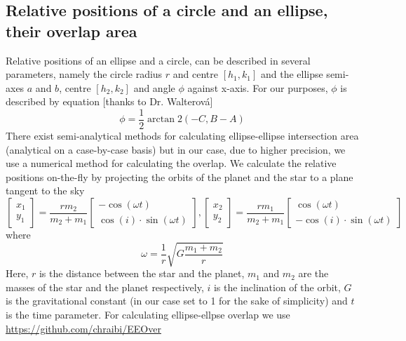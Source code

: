 \documentclass[10pt]{article}
\numberwithin{equation}{subsection}
\begin{document}
\subsection{Relative positions of a circle and an ellipse, their overlap area}
Relative positions of an ellipse and a circle, can be described
in several parameters, namely the circle radius $r$ and centre $[h_1, k_1]$ and the
ellipse semi-axes $a$ and $b$, centre $[h_2, k_2]$ and angle $\phi$ against x-axis. For
our purposes, $\phi$ is described by equation \cite{correia1} [thanks to Dr. Walterová]
\begin{equation}
  \phi = \frac{1}{2}\arctan 2(-C, B-A)
  \label{eq:phi}
\end{equation}
There exist semi-analytical methods for calculating ellipse-ellipse intersection area
(analytical on a case-by-case basis) \cite{eeover} but in our case, due to higher
precision, we use a numerical method for calculating the overlap.
We calculate the relative positions on-the-fly by projecting the orbits of the planet
and the star to a plane tangent to the sky
\begin{equation}
  \begin{bmatrix}
    x_1 \\
    y_1 
  \end{bmatrix}
  = \frac{rm_2}{m_2+m_1}
  \begin{bmatrix}
    -\cos(\omega t) \\
    \cos(i)\cdot\sin(\omega t)
  \end{bmatrix},
  \begin{bmatrix}
    x_2 \\
    y_2 
  \end{bmatrix}
  = \frac{rm_1}{m_2+m_1}
  \begin{bmatrix}
    \cos(\omega t) \\
    -\cos(i)\cdot\sin(\omega t)
  \end{bmatrix}
  \label{eq:projected-orbit}
\end{equation}
where
\begin{equation}
  \omega = \frac{1}{r}\sqrt{G\frac{m_1 + m_2}{r}}
  \label{eq:omega}
\end{equation}
Here, $r$ is the distance between the star and the planet, $m_1$ and $m_2$ are the masses
of the star and the planet respectively, $i$ is the inclination of the orbit, $G$ is the
gravitational constant (in our case set to 1 for the sake of simplicity) and $t$ is the
time parameter.
For calculating ellipse-ellpse overlap we use \url{https://github.com/chraibi/EEOver}
\end{document}
